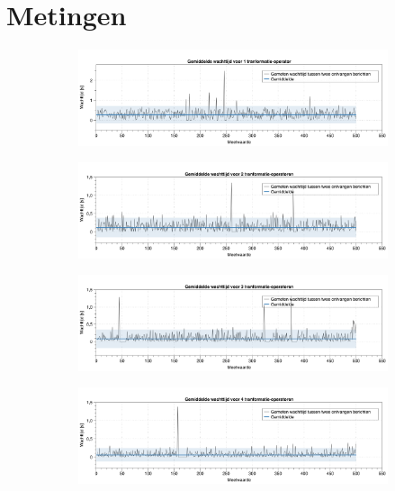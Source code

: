 \documentclass[twocolumn, a4paper]{article}
\begin{document}
\section{Metingen}
\begin{figure}[htb]
    \centering
    \begin{subfigure}{0.88\textwidth}
        \centering
        \includegraphics[width=\textwidth]{1_operator}        
    \end{subfigure}  
    \begin{subfigure}{0.88\textwidth}
        \centering
        \includegraphics[width=\textwidth]{2_operator}        
    \end{subfigure}  
    \begin{subfigure}{0.88\textwidth}
        \centering
        \includegraphics[width=\textwidth]{3_operator}        
    \end{subfigure}  
    \begin{subfigure}{0.88\textwidth}
        \centering
        \includegraphics[width=\textwidth]{4_operator}        

\end{subfigure}
\end{figure}
\end{document}
